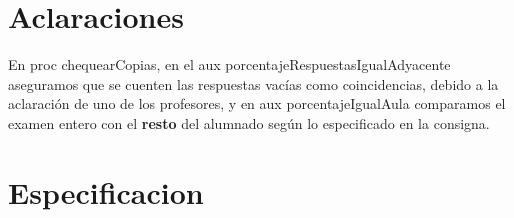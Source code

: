 \documentclass[11pt,a4paper]{article}
\begin{document}
\maketitle

\section{Aclaraciones}

En proc chequearCopias, en el aux porcentajeRespuestasIgualAdyacente aseguramos que se cuenten las respuestas vacías como coincidencias, debido a la aclaración de uno de los profesores, y en aux porcentajeIgualAula comparamos el examen entero con el \textbf{resto} del alumnado según lo especificado en la consigna.

\section{Especificacion}
\end{document}
